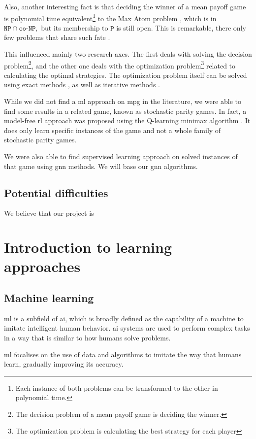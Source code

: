 Also, another interesting fact is that deciding the winner of a mean payoff game is polynomial time equivalent\footnote{Each instance of both problems can be transformed to the other in polynomial time.} to the Max Atom problem \cite{MPGMaxAtom}, which is in $\texttt{NP}\cap \texttt{co-NP},$ but its membership to $\mathtt{P}$ is still open. This is remarkable, there only few problems that share such fate \cite{NPInterCoNP}.


This influenced mainly two research axes. The first deals with solving the decision problem\footnote{The decision problem of a mean payoff game is deciding the winner.}, and the other one deals with the optimization problem\footnote{The optimization problem is calculating the best strategy for each player} related to calculating the optimal strategies. The optimization problem itself can be solved using exact methods \cite{MPGMaxAtom}, as well as iterative methods \cite{StrategyImprovement,SimplexMPG}.

While we did not find a \acrfull{ml} approach on \acrshort{mpg} in the literature, we were able to find some results in a related game, known as stochastic parity games. In fact, a model-free \acrfull{rl} approach was proposed using the Q-learning minimax algorithm \cite{??}. It does only learn specific instances of the game and not a whole family of stochastic parity games.

We were also able to find supervised learning approach on solved instances of that game using \acrfull{gnn} methods. We will base our \acrshort{gnn} algorithms.

\subsection{Potential difficulties}
We believe that our project is 
 
\section{Introduction to learning approaches}
\subsection{Machine learning}
\acrfull{ml} is a subfield of \acrfull{ai}, which is broadly defined as the capability of a machine to imitate intelligent human behavior. \acrshort{ai} systems are used to perform complex tasks in a way that is similar to how humans solve problems.

\acrshort{ml} focalises on the use of data and algorithms to imitate the way that humans learn, gradually improving its accuracy.

